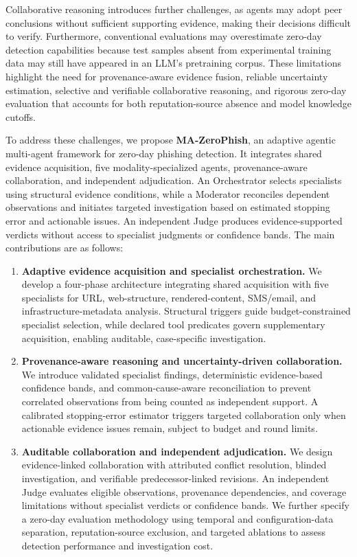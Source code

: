 Collaborative reasoning introduces further challenges,
as agents may adopt peer conclusions without sufficient
supporting evidence, making their decisions difficult
to verify. Furthermore, conventional evaluations may
overestimate zero-day detection capabilities because
test samples absent from experimental training data
may still have appeared in an LLM's pretraining corpus.
These limitations highlight the need for
provenance-aware evidence fusion, reliable uncertainty
estimation, selective and verifiable collaborative
reasoning, and rigorous zero-day evaluation that
accounts for both reputation-source absence and
model knowledge cutoffs.



To address these challenges, we propose
\textbf{MA-ZeroPhish}, an adaptive agentic
multi-agent framework for zero-day phishing
detection. It integrates shared evidence
acquisition, five modality-specialized agents,
provenance-aware collaboration, and independent
adjudication. An Orchestrator selects specialists
using structural evidence conditions, while a
Moderator reconciles dependent observations
and initiates targeted investigation based on
estimated stopping error and actionable issues.
An independent Judge produces evidence-supported
verdicts without access to specialist judgments
or confidence bands. The main contributions
are as follows:

\begin{enumerate}

\item \textbf{Adaptive evidence acquisition
and specialist orchestration.}
We develop a four-phase architecture integrating
shared acquisition with five specialists for
URL, web-structure, rendered-content, SMS/email,
and infrastructure-metadata analysis.
Structural triggers guide budget-constrained
specialist selection, while declared tool
predicates govern supplementary acquisition,
enabling auditable, case-specific investigation.

\item \textbf{Provenance-aware reasoning
and uncertainty-driven collaboration.}
We introduce validated specialist findings,
deterministic evidence-based confidence bands,
and common-cause-aware reconciliation to prevent
correlated observations from being counted as
independent support. A calibrated stopping-error
estimator triggers targeted collaboration only
when actionable evidence issues remain, subject
to budget and round limits.

\item \textbf{Auditable collaboration
and independent adjudication.}
We design evidence-linked collaboration with
attributed conflict resolution, blinded
investigation, and verifiable predecessor-linked
revisions. An independent Judge evaluates
eligible observations, provenance dependencies,
and coverage limitations without specialist
verdicts or confidence bands. We further
specify a zero-day evaluation methodology
using temporal and configuration-data
separation, reputation-source exclusion,
and targeted ablations to assess detection
performance and investigation cost.

\end{enumerate}




